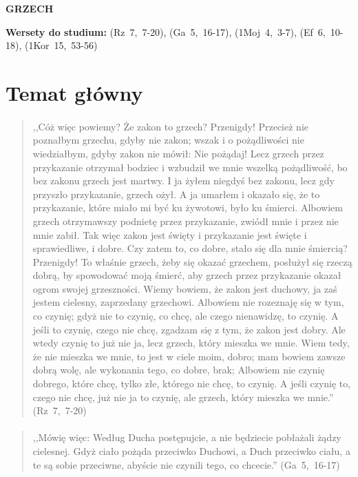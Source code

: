 \documentclass[10pt,a4paper,oneside]{article}
\begin{document}
\centerline{\textbf{\MakeUppercase{Grzech}}}
\begin{center}
\textbf{Wersety do studium:} 
\mbox{(Rz 7, 7-20)}, \mbox{(Ga 5, 16-17)}, \mbox{(1Moj 4, 3-7)}, \mbox{(Ef 6, 10-18)}, \mbox{(1Kor 15, 53-56)}
\end{center}
\section{Temat główny}
\paragraph{}
\begin{quote}
,,Cóż więc powiemy? Że zakon to grzech? Przenigdy! Przecież nie poznałbym grzechu, gdyby nie zakon; wszak i o pożądliwości nie wiedziałbym, gdyby zakon nie mówił: Nie pożądaj! Lecz grzech przez przykazanie otrzymał bodziec i wzbudził we mnie wszelką pożądliwość, bo bez zakonu grzech jest martwy. I ja żyłem niegdyś bez zakonu, lecz gdy przyszło przykazanie, grzech ożył. A ja umarłem i okazało się, że to przykazanie, które miało mi być ku żywotowi, było ku śmierci. Albowiem grzech otrzymawszy podnietę przez przykazanie, zwiódł mnie i przez nie mnie zabił. Tak więc zakon jest święty i przykazanie jest święte i sprawiedliwe, i dobre. Czy zatem to, co dobre, stało się dla mnie śmiercią? Przenigdy! To właśnie grzech, żeby się okazać grzechem, posłużył się rzeczą dobrą, by spowodować moją śmierć, aby grzech przez przykazanie okazał ogrom swojej grzeszności. Wiemy bowiem, że zakon jest duchowy, ja zaś jestem cielesny, zaprzedany grzechowi. Albowiem nie rozeznaję się w tym, co czynię; gdyż nie to czynię, co chcę, ale czego nienawidzę, to czynię. A jeśli to czynię, czego nie chcę, zgadzam się z tym, że zakon jest dobry. Ale wtedy czynię to już nie ja, lecz grzech, który mieszka we mnie. Wiem tedy, że nie mieszka we mnie, to jest w ciele moim, dobro; mam bowiem zawsze dobrą wolę, ale wykonania tego, co dobre, brak; Albowiem nie czynię dobrego, które chcę, tylko złe, którego nie chcę, to czynię. A jeśli czynię to, czego nie chcę, już nie ja to czynię, ale grzech, który mieszka we mnie.'' \mbox{(Rz 7, 7-20)}
\end{quote}
\paragraph{}
\begin{quote}
,,Mówię więc: Według Ducha postępujcie, a nie będziecie pobłażali żądzy cielesnej. Gdyż ciało pożąda przeciwko Duchowi, a Duch przeciwko ciału, a te są sobie przeciwne, abyście nie czynili tego, co chcecie.'' \mbox{(Ga 5, 16-17)}
\end{quote}
\end{document}
